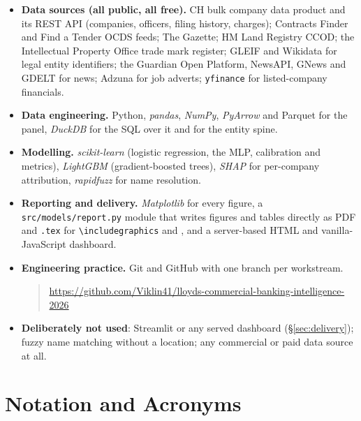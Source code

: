 \documentclass[    author={Samuel Menon Demelo; Sneha Saphala Ram Prasad; 
Viktor Ander Lindholm; Vishal Khatri},
               supervisor={Prof. Fernando Moreno-Pino},
                   degree={MSc},
                    title={Lloyds Commercial Banking Intelligence},
                 subtitle={Ranking SME Lending, Risk and Growth Prospects for Lloyds Banking Group},
                     type={},
                     year={2026}]{dissertation}
\newcommand{\note}[1]{}
\begin{document}
\begin{itemize}
\item \textbf{Data sources (all public, all free).} CH bulk company
      data product and its REST API (companies, officers, filing history,
      charges); Contracts Finder and Find a Tender OCDS feeds; The Gazette;
      HM Land Registry CCOD; the Intellectual
      Property Office trade mark register; GLEIF and Wikidata for legal entity
      identifiers; the Guardian Open Platform, NewsAPI, GNews and GDELT for news;
      Adzuna for job adverts; \texttt{yfinance} for listed-company financials.
\item \textbf{Data engineering.} Python, \emph{pandas}, \emph{NumPy},
      \emph{PyArrow} and Parquet for the panel, \emph{DuckDB} for the SQL over
      it and for the entity spine.
\item \textbf{Modelling.} \emph{scikit-learn} (logistic regression, the MLP,
      calibration and metrics), \emph{LightGBM} (gradient-boosted trees),
      \emph{SHAP} for per-company attribution, \emph{rapidfuzz} for name
      resolution.
\item \textbf{Reporting and delivery.} \emph{Matplotlib} for every figure, a
      \texttt{src/models/report.py} module that writes figures and tables
      directly as PDF and \texttt{.tex} for \verb|\includegraphics| and
      \verb||, and a server-based HTML and vanilla-JavaScript
      dashboard.
\item \textbf{Engineering practice.} Git and GitHub with one branch per workstream.
      \begin{quote}
          \url{https://github.com/Viklin41/lloyds-commercial-banking-intelligence-2026}
      \end{quote}
\item \textbf{Deliberately not used}: Streamlit or any served dashboard (\S\ref{sec:delivery}); fuzzy name matching without a location; any commercial or paid data source at all.
\end{itemize}

\chapter*{Notation and Acronyms}
\note{Two tables. The first is ordinary acronyms. The second is the vocabulary
we defined ourselves, which matters more, because a reader who does not know
what we mean by an ``origin'' or a ``gate'' cannot follow Chapter 4 at all.}
\end{document}
